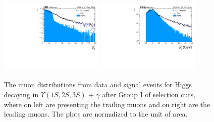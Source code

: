 \begin{figure}[!htbp]
\begin{center}
\includegraphics[width=0.45\textwidth]{figures_and_tables/outputPlots/HtoUpsilon_Cat0_ZZZZZ/au/data_x_mc/noKinCuts/h_noKin_TrailingMu_pt}\hspace*{1.cm}
\includegraphics[width=0.45\textwidth]{figures_and_tables/outputPlots/HtoUpsilon_Cat0_ZZZZZ/au/data_x_mc/noKinCuts/h_noKin_LeadingMu_pt}
\end{center}\vspace*{-.5cm}
\caption{The \PT muon distributions from data and signal events for Higgs decaying in $\Upsilon(1S,2S,3S)$ + $\gamma$ after Group I of selection cuts, where on left are presenting the trailing muons and on right are the leading muons. The plots are normalized to the unit of area.}
\label{fig:pTMuons_HtoUpsilon_Cat0}
\end{figure}


